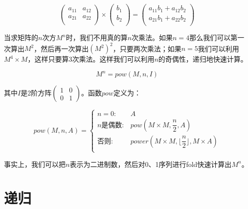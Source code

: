 \documentclass[UTF8]{article}
\begin{document}
\begin{enumerate}
\[
\begin{pmatrix}
a_{11} & a_{12} \\
a_{21} & a_{22} \\
\end{pmatrix}
\times
\begin{pmatrix}
b_{1} \\
b_{2} \\
\end{pmatrix}
=
\begin{pmatrix}
a_{11} b_{1} + a_{12} b_{2} \\
a_{21} b_{1} + a_{22} b_{2} \\
\end{pmatrix}
\]

当求矩阵的$n$次方$M^n$时，我们不用真的算$n$次乘法。如果$n=4$那么我们可以第一次算出$M^2$，然后再一次算出$(M^2)^2$，只要两次乘法；如果$n = 5$我们可以利用$M^4 \times M$，这样只要算3次乘法。这样我们可以利用$n$的奇偶性，递归地快速计算。

\[
M^n = pow(M, n, I)
\]

其中$I$是2阶方阵$\displaystyle \begin{pmatrix} 1 & 0 \\ 0 & 1\end{pmatrix}$。函数$pow$定义为：

\[
pow(M, n, A) = \begin{cases}
n = 0: & A \\
n\text{是偶数}: & pow(M \times M, \dfrac{n}{2}, A) \\
\text{否则}: & power(M \times M, \lfloor \dfrac{n}{2} \rfloor, M \times A)\\
\end{cases}
\]

事实上，我们可以把$n$表示为二进制数，然后对0、1序列进行fold快速计算出$M^n$。

\end{enumerate}

\section{递归}
\end{document}
